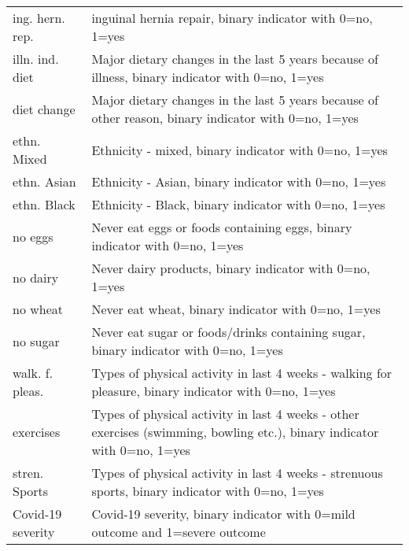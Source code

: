 \begin{longtable}[c]{lp{8cm}}
        ing. hern. rep.	&	inguinal hernia repair, binary indicator with 0=no, 1=yes	\\
        illn. ind. diet	&	Major dietary changes in the last 5 years because of illness, binary indicator with 0=no, 1=yes	\\
        diet change	&	Major dietary changes in the last 5 years  because of other reason, binary indicator with 0=no, 1=yes	\\
        ethn. Mixed	&	Ethnicity - mixed, binary indicator with 0=no, 1=yes	\\
        ethn. Asian	&	Ethnicity - Asian, binary indicator with 0=no, 1=yes	\\
        ethn. Black	&	Ethnicity - Black, binary indicator with 0=no, 1=yes	\\
        no eggs	&	Never eat eggs or foods containing eggs, binary indicator with 0=no, 1=yes	\\
        no dairy	&	Never dairy products, binary indicator with 0=no, 1=yes	\\
        no wheat	&	Never eat wheat, binary indicator with 0=no, 1=yes	\\
        no sugar	&	Never eat sugar or foods/drinks containing sugar, binary indicator with 0=no, 1=yes	\\
        walk. f. pleas.	&	Types of physical activity in last 4 weeks - walking for pleasure, binary indicator with 0=no, 1=yes	\\
        exercises	&	Types of physical activity in last 4 weeks - other exercises (swimming, bowling etc.), binary indicator with 0=no, 1=yes	\\
        stren. Sports	&	Types of physical activity in last 4 weeks -  strenuous sports, binary indicator with 0=no, 1=yes	\\
        Covid-19 severity	&	Covid-19 severity, binary indicator with 0=mild outcome and 1=severe outcome	\\
    \hline
\end{longtable}
